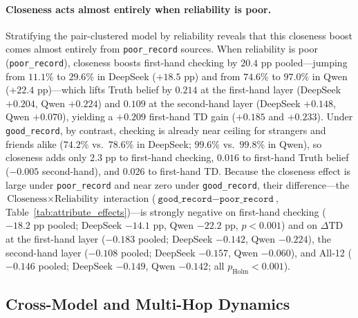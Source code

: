 \paragraph{Closeness acts almost entirely when reliability is poor.}
Stratifying the pair-clustered model by reliability reveals that this closeness boost comes almost entirely from \texttt{poor\_record} sources. When reliability is poor (\texttt{poor\_record}), closeness boosts first-hand checking by $20.4\text{ pp}$ pooled---jumping from $11.1\%$ to $29.6\%$ in DeepSeek ($+18.5\text{ pp}$) and from $74.6\%$ to $97.0\%$ in Qwen ($+22.4\text{ pp}$)---which lifts Truth belief by $0.214$ at the first-hand layer (DeepSeek $+0.204$, Qwen $+0.224$) and $0.109$ at the second-hand layer (DeepSeek $+0.148$, Qwen $+0.070$), yielding a $+0.209$ first-hand TD gain ($+0.185$ and $+0.233$). Under \texttt{good\_record}, by contrast, checking is already near ceiling for strangers and friends alike ($74.2\%$ vs.\ $78.6\%$ in DeepSeek; $99.6\%$ vs.\ $99.8\%$ in Qwen), so closeness adds only $2.3\text{ pp}$ to first-hand checking, $0.016$ to first-hand Truth belief ($-0.005$ second-hand), and $0.026$ to first-hand TD. Because the closeness effect is large under \texttt{poor\_record} and near zero under \texttt{good\_record}, their difference---the $\text{Closeness} \times \text{Reliability}$ interaction ($\texttt{good\_record} - \texttt{poor\_record}$, Table~\ref{tab:attribute_effects})---is strongly negative on first-hand checking ($-18.2\text{ pp}$ pooled; DeepSeek $-14.1\text{ pp}$, Qwen $-22.2\text{ pp}$, $p < 0.001$) and on $\Delta\text{TD}$ at the first-hand layer ($-0.183$ pooled; DeepSeek $-0.142$, Qwen $-0.224$), the second-hand layer ($-0.108$ pooled; DeepSeek $-0.157$, Qwen $-0.060$), and All-12 ($-0.146$ pooled; DeepSeek $-0.149$, Qwen $-0.142$; all $p_{\text{Holm}} < 0.001$).

\subsection{Cross-Model and Multi-Hop Dynamics}
\label{sec:pillar3}


